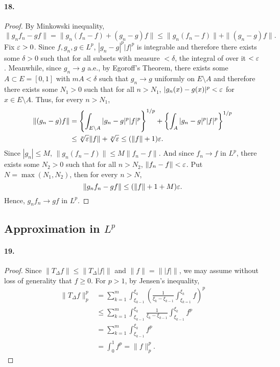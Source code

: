   \paragraph{18.}
  \begin{proof}
    By Minkowski inequality, 
    \[
      \|g_nf_n-gf\| = \|g_n(f_n-f)+(g_n-g)f\| \le \|g_n(f_n-f)\|+\|(g_n-g)f\|.
    \]
    Fix $\varepsilon>0$. Since $f,g_n,g\in L^p$, $|g_n-g|^p|f|^p$ is integrable and 
    therefore there exists some $\delta>0$ such that for all subsets with 
    measure $<\delta$, the integral of over it $<\varepsilon$. Meanwhile, since $g_n\to
    g$ a.e., by Egoroff's Theorem, there exists some $A\subset E=[0,1]$ with $mA
    <\delta$ such that $g_n\to g$ uniformly on $E\setminus A$ and therefore 
    there exists some $N_1>0$ such that for all $n>N_1$, $|g_n(x)-g(x)|^p<\varepsilon$
    for $x\in E\setminus A$. Thus, for every $n>N_1$,
    \begin{align*}
      \|(g_n-g)f\|
      &=\left\{\int_{E\setminus A}|g_n-g|^p|f|^p\right\}^{1/p} + 
        \left\{\int_A|g_n-g|^p|f|^p\right\}^{1/p} \\
      & \le \sqrt[p]{\varepsilon}\|f\| + \sqrt[p]{\varepsilon} \le (\|f\|+1)\varepsilon.
    \end{align*}
    Since $|g_n|\le M$, $\|g_n(f_n-f)\|\le M\|f_n-f\|$. And since $f_n\to f$ in 
    $L^p$, there exists some $N_2>0$ such that for all $n>N_2$, $\|f_n-f\|<
    \varepsilon$. Put $N=\max(N_1,N_2)$, then for every $n>N$,
    \[
      \|g_nf_n-gf\| \le (\|f\|+1+M)\varepsilon.
    \]
    Hence, $g_nf_n\to gf$ in $L^p$.
  \end{proof}

\subsection{Approximation in $L^p$}
  \paragraph{19.}
  \begin{proof}
    Since $\|T_\Delta f\|\le \|T_\Delta|f|\|$ and $\|f\|=\||f|\|$, we may assume
    without loss of generality that $f\ge 0$. For $p>1$, by Jensen's inequality,
    \begin{align*}
      \|T_\Delta f\|_p^p 
      &= \sum_{k=1}^m\int_{\xi_{k-1}}^{\xi_k}
      \left(\frac{1}{\xi_k-\xi_{k-1}}\int_{\xi_{k=1}}^{\xi_k}f\right)^p \\
      &\le \sum_{k=1}^m\int_{\xi_{k-1}}^{\xi_k}
      \frac{1}{\xi_k-\xi_{k-1}}\int_{\xi_{k-1}}^{\xi_k}f^p \\
      &= \sum_{k=1}^m\int_{\xi_{k-1}}^{\xi_k}f^p \\
      &= \int_0^1f^p = \|f\|_p^p.
    \end{align*}
  \end{proof}

